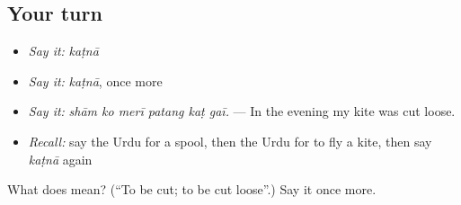 \subsection*{Your turn}
\begin{itemize}
\raggedright
  \item \emph{Say it:} \emph{kaṭnā}
  \item \emph{Say it:} \emph{kaṭnā}, once more
  \item \emph{Say it:} \emph{shām ko merī patang kaṭ gaī.} — In the evening my kite was cut loose.
  \item \emph{Recall:} say the Urdu for a spool, then the Urdu for to fly a kite, then say \emph{kaṭnā} again
\end{itemize}

\begin{tcolorbox}[breakable,colback=teal!4,colframe=teal!35!black,title={Before you move on}]
What does  mean? (\textquotedblleft{}To be cut; to be cut loose\textquotedblright{}.) Say it once more.
\end{tcolorbox}
